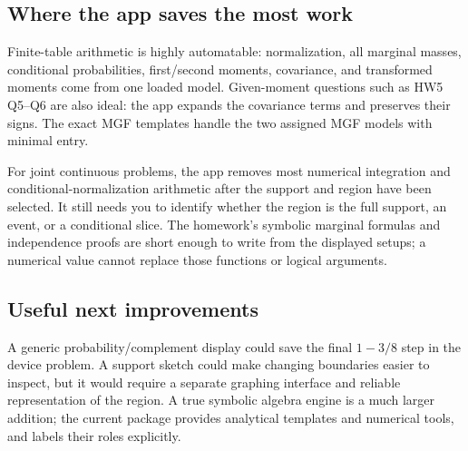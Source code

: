 \subsection*{Where the app saves the most work}
Finite-table arithmetic is highly automatable: normalization, all marginal masses, conditional probabilities, first/second moments, covariance, and transformed moments come from one loaded model. Given-moment questions such as HW5 Q5--Q6 are also ideal: the app expands the covariance terms and preserves their signs. The exact MGF templates handle the two assigned MGF models with minimal entry.

For joint continuous problems, the app removes most numerical integration and conditional-normalization arithmetic after the support and region have been selected. It still needs you to identify whether the region is the full support, an event, or a conditional slice. The homework's symbolic marginal formulas and independence proofs are short enough to write from the displayed setups; a numerical value cannot replace those functions or logical arguments.

\subsection*{Useful next improvements}
A generic probability/complement display could save the final $1-3/8$ step in the device problem. A support sketch could make changing boundaries easier to inspect, but it would require a separate graphing interface and reliable representation of the region. A true symbolic algebra engine is a much larger addition; the current package provides analytical templates and numerical tools, and labels their roles explicitly.
